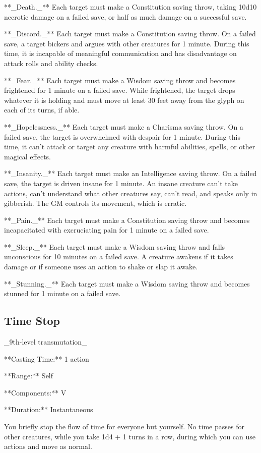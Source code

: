 **_Death._** Each target must make a Constitution saving throw, taking 10d10 necrotic damage on a failed save, or half as much damage on a successful save.

**_Discord._** Each target must make a Constitution saving throw. On a failed save, a target bickers and argues with other creatures for 1 minute. During this time, it is incapable of meaningful communication and has disadvantage on attack rolls and ability checks.

**_Fear._** Each target must make a Wisdom saving throw and becomes frightened for 1 minute on a failed save. While frightened, the target drops whatever it is holding and must move at least 30 feet away from the glyph on each of its turns, if able.

**_Hopelessness._** Each target must make a Charisma saving throw. On a failed save, the target is overwhelmed with despair for 1 minute. During this time, it can’t attack or target any creature with harmful abilities, spells, or other magical effects.

**_Insanity._** Each target must make an Intelligence saving throw. On a failed save, the target is driven insane for 1 minute. An insane creature can’t take actions, can’t understand what other creatures say, can’t read, and speaks only in gibberish. The GM controls its movement, which is erratic.

**_Pain._** Each target must make a Constitution saving throw and becomes incapacitated with excruciating pain for 1 minute on a failed save.

**_Sleep._** Each target must make a Wisdom saving throw and falls unconscious for 10 minutes on a failed save. A creature awakens if it takes damage or if someone uses an action to shake or slap it awake.

**_Stunning._** Each target must make a Wisdom saving throw and becomes stunned for 1 minute on a failed save.

\subsection{Time Stop}

_9th-level transmutation_

**Casting Time:** 1 action

**Range:** Self

**Components:** V

**Duration:** Instantaneous

You briefly stop the flow of time for everyone but yourself. No time passes for other creatures, while you take 1d4 + 1 turns in a row, during which you can use actions and move as normal.

